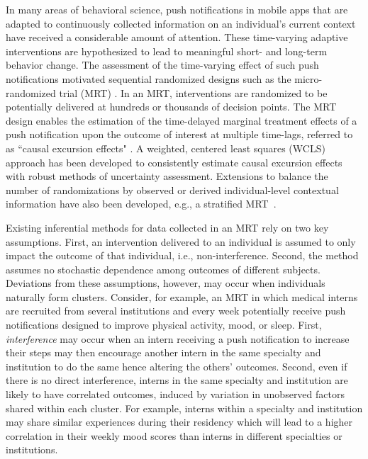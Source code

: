 \documentclass[12pt]{article}
\begin{document}
In many areas of behavioral science, push notifications in mobile apps that are adapted to continuously collected information on an individual's current context have received a considerable amount of attention.  These time-varying adaptive interventions are hypothesized to lead to meaningful short- and long-term behavior change. The assessment of the time-varying effect of such push notifications motivated sequential randomized designs such as the micro-randomized trial (MRT) \citep{Nahum2017, KlasnjaMRT}. In an MRT, interventions are randomized to be potentially delivered at hundreds or thousands of decision points. The MRT design enables the estimation of the time-delayed marginal treatment effects of a push notification upon the outcome of interest at multiple time-lags, referred to as ``causal excursion effects" \citep{Boruvkaetal, Qian2021}. A weighted, centered least squares (WCLS) approach has been developed to consistently estimate causal excursion effects with robust methods of uncertainty assessment. Extensions to balance the number of randomizations by observed or derived individual-level contextual information have also been developed, e.g., a stratified MRT~\citep{DempseyAOAS}.

Existing inferential methods for data collected in an MRT rely on two key assumptions. First, an intervention delivered to an individual is assumed to only impact the outcome of that individual, i.e., non-interference. Second, the method assumes no stochastic dependence among outcomes of different subjects. Deviations from these assumptions, however, may occur when individuals naturally form clusters.  Consider, for example, an MRT in which medical interns are recruited from several institutions and every week potentially receive push notifications designed to improve physical activity, mood, or sleep. First, \textit{interference} may occur when an intern receiving a push notification to increase their steps may then encourage another intern in the same specialty and institution to do the same hence altering the others' outcomes. Second, even if there is no direct interference, interns in the same specialty and institution are likely to have correlated outcomes, induced by variation in unobserved factors shared within each cluster. For example, interns within a specialty and institution may share similar experiences during their residency which will lead to a higher correlation in their weekly mood scores than interns in different specialties or institutions.
\end{document}
